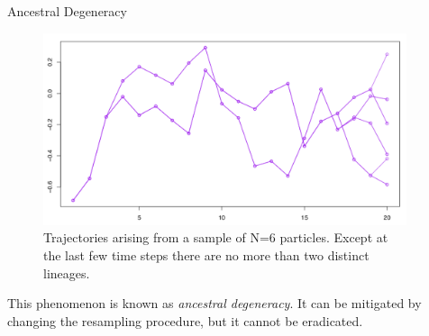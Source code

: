 \documentclass[final, 12pt]{beamer}
\newlength{\colwidth}
\begin{document}
\begin{frame}
\begin{columns}
\begin{column}{\colwidth}
\begin{block}{Ancestral Degeneracy}
\begin{figure}
\includegraphics[width=0.9\colwidth]{degeneracy.pdf}
\caption{Trajectories arising from a sample of N=6 particles. Except at the last few time steps there are no more than two distinct lineages.}
\end{figure}

This phenomenon is known as \emph{ancestral degeneracy}. It can be mitigated by changing the resampling procedure, but it cannot be eradicated.

\end{block}
\end{column}

\begin{column}{\colwidth}
\begin{block}

\end{block}
\end{column}
\end{columns}

\end{frame}
\end{document}
